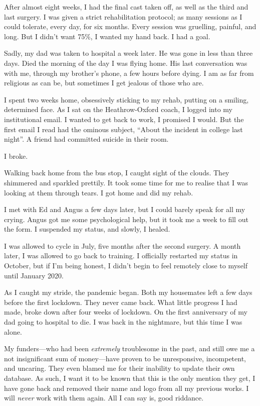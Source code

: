 After almost eight weeks, I had the final cast taken off, as well as the third and last surgery. I was given a strict rehabilitation protocol; as many sessions as I could tolerate, every day, for six months. Every session was gruelling, painful, and long. But I didn't want 75\%, I wanted my hand back. I had a goal.

Sadly, my dad was taken to hospital a week later. He was gone in less than three days. Died the morning of the day I was flying home. His last conversation was with me, through my brother's phone, a few hours before dying. I am as far from religious as can be, but sometimes I get jealous of those who are.

I spent two weeks home, obsessively sticking to my rehab, putting on a smiling, determined face. As I sat on the Heathrow-Oxford coach, I logged into my institutional email. I wanted to get back to work, I promised I would. But the first email I read had the ominous subject, ``About the incident in college last night''. A friend had committed suicide in their room.

I broke.

Walking back home from the bus stop, I caught sight of the clouds. They shimmered and sparkled prettily. It took some time for me to realise that I was looking at them through tears. I got home and did my rehab.

I met with Ed and Angus a few days later, but I could barely speak for all my crying. Angus got me some psychological help, but it took me a week to fill out the form. I suspended my status, and slowly, I healed.

I was allowed to cycle in July, five months after the second surgery. A month later, I was allowed to go back to training. I officially restarted my status in October, but if I'm being honest, I didn't begin to feel remotely close to myself until January 2020.

As I caught my stride, the pandemic began. Both my housemates left a few days before the first lockdown. They never came back. What little progress I had made, broke down after four weeks of lockdown. On the first anniversary of my dad going to hospital to die. I was back in the nightmare, but this time I was alone.

My funders---who had been \emph{extremely} troublesome in the past, and still owe me a not insignificant sum of money---have proven to be unresponsive, incompetent, and uncaring. They even blamed me for their inability to update their own database. As such, I want it to be known that this is the only mention they get, I have gone back and removed their name and logo from all my previous works. I will \emph{never} work with them again. All I can say is, good riddance.

